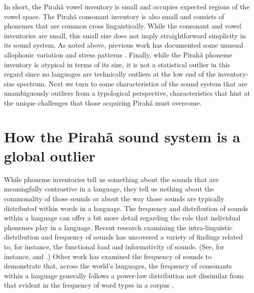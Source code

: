 \documentclass[output=paper,colorlinks,citecolor=brown
]{langscibook}
\begin{document}
    In short, the Pirahã vowel inventory is small and occupies expected regions of the vowel space. The Pirahã consonant inventory is also small and consists of phonemes that are common cross linguistically. While the consonant and vowel inventories are small, this small size does not imply straightforward simplicity in its sound system. As noted above, previous work has documented some unusual allophonic variation and stress patterns \citep{everett1984relevance, everett1986piraha}. Finally, while the Pirahã phoneme inventory is atypical in terms of its size, it is not a statistical outlier in this regard since no languages are technically outliers at the low end of the inventory-size spectrum. Next we turn to some characteristics of the sound system that are unambiguously outliers from a typological perspective, characteristics that hint at the unique challenges that those acquiring Pirahã must overcome.

\section{How the Pirahã sound system is a global outlier}

    While phoneme inventories tell us something about the sounds that are meaningfully contrastive in a language, they tell us nothing about the commonality of those sounds or about the way those sounds are typically distributed within words in a language. The frequency and distribution of sounds within a language can offer a bit more detail regarding the role that individual phonemes play in a language. Recent research examining the intra-linguistic distribution and frequency of sounds has uncovered a variety of findings related to, for instance, the functional load and informativity of sounds. (See, for instance,  and .) Other work has examined the frequency of sounds to demonstrate that, across the world’s languages, the frequency of consonants within a language generally follows a power-law distribution not dissimilar from that evident in the frequency of word types in a corpus \citep{everett2018similar}.
    
\end{document}
